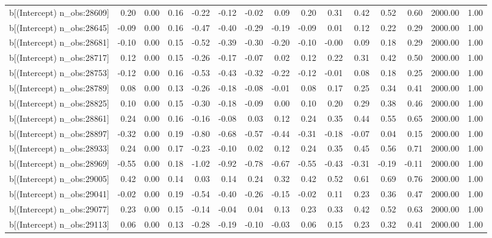 \begin{table}[ht]
\begin{tabular}{rrrrrrrrrrrrrrr}
  b[(Intercept) n\_obs:28609] & 0.20 & 0.00 & 0.16 & -0.22 & -0.12 & -0.02 & 0.09 & 0.20 & 0.31 & 0.42 & 0.52 & 0.60 & 2000.00 & 1.00 \\ 
  b[(Intercept) n\_obs:28645] & -0.09 & 0.00 & 0.16 & -0.47 & -0.40 & -0.29 & -0.19 & -0.09 & 0.01 & 0.12 & 0.22 & 0.29 & 2000.00 & 1.00 \\ 
  b[(Intercept) n\_obs:28681] & -0.10 & 0.00 & 0.15 & -0.52 & -0.39 & -0.30 & -0.20 & -0.10 & -0.00 & 0.09 & 0.18 & 0.29 & 2000.00 & 1.00 \\ 
  b[(Intercept) n\_obs:28717] & 0.12 & 0.00 & 0.15 & -0.26 & -0.17 & -0.07 & 0.02 & 0.12 & 0.22 & 0.31 & 0.42 & 0.50 & 2000.00 & 1.00 \\ 
  b[(Intercept) n\_obs:28753] & -0.12 & 0.00 & 0.16 & -0.53 & -0.43 & -0.32 & -0.22 & -0.12 & -0.01 & 0.08 & 0.18 & 0.25 & 2000.00 & 1.00 \\ 
  b[(Intercept) n\_obs:28789] & 0.08 & 0.00 & 0.13 & -0.26 & -0.18 & -0.08 & -0.01 & 0.08 & 0.17 & 0.25 & 0.34 & 0.41 & 2000.00 & 1.00 \\ 
  b[(Intercept) n\_obs:28825] & 0.10 & 0.00 & 0.15 & -0.30 & -0.18 & -0.09 & 0.00 & 0.10 & 0.20 & 0.29 & 0.38 & 0.46 & 2000.00 & 1.00 \\ 
  b[(Intercept) n\_obs:28861] & 0.24 & 0.00 & 0.16 & -0.16 & -0.08 & 0.03 & 0.12 & 0.24 & 0.35 & 0.44 & 0.55 & 0.65 & 2000.00 & 1.00 \\ 
  b[(Intercept) n\_obs:28897] & -0.32 & 0.00 & 0.19 & -0.80 & -0.68 & -0.57 & -0.44 & -0.31 & -0.18 & -0.07 & 0.04 & 0.15 & 2000.00 & 1.00 \\ 
  b[(Intercept) n\_obs:28933] & 0.24 & 0.00 & 0.17 & -0.23 & -0.10 & 0.02 & 0.12 & 0.24 & 0.35 & 0.45 & 0.56 & 0.71 & 2000.00 & 1.00 \\ 
  b[(Intercept) n\_obs:28969] & -0.55 & 0.00 & 0.18 & -1.02 & -0.92 & -0.78 & -0.67 & -0.55 & -0.43 & -0.31 & -0.19 & -0.11 & 2000.00 & 1.00 \\ 
  b[(Intercept) n\_obs:29005] & 0.42 & 0.00 & 0.14 & 0.03 & 0.14 & 0.24 & 0.32 & 0.42 & 0.52 & 0.61 & 0.69 & 0.76 & 2000.00 & 1.00 \\ 
  b[(Intercept) n\_obs:29041] & -0.02 & 0.00 & 0.19 & -0.54 & -0.40 & -0.26 & -0.15 & -0.02 & 0.11 & 0.23 & 0.36 & 0.47 & 2000.00 & 1.00 \\ 
  b[(Intercept) n\_obs:29077] & 0.23 & 0.00 & 0.15 & -0.14 & -0.04 & 0.04 & 0.13 & 0.23 & 0.33 & 0.42 & 0.52 & 0.63 & 2000.00 & 1.00 \\ 
  b[(Intercept) n\_obs:29113] & 0.06 & 0.00 & 0.13 & -0.28 & -0.19 & -0.10 & -0.03 & 0.06 & 0.15 & 0.23 & 0.32 & 0.41 & 2000.00 & 1.00 \\ 

\end{tabular}
\end{table}
